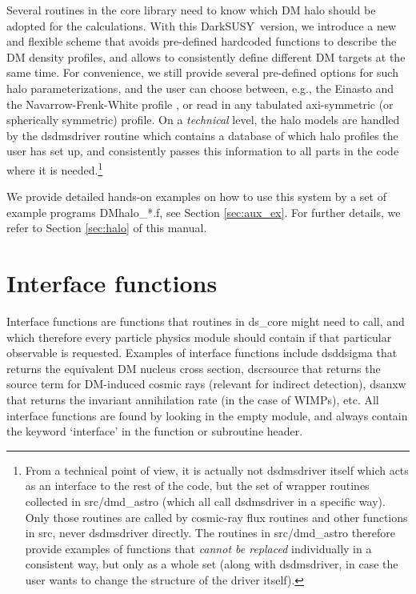 \documentclass[a4paper,10pt,oneside]{book}
\newcommand{\code}[1]{\ft{#1}}
\newcommand{\ds}{{\sffamily DarkSUSY}}
\newcommand{\ft}[1]{\textsf{#1}}
\begin{document}
Several routines in the core library need to know which DM halo should be adopted for the 
calculations. With this \ds\ version, we introduce a new and flexible scheme that avoids 
pre-defined hardcoded functions to describe the DM density profiles, and allows to 
consistently define different DM targets at the same time. For convenience, we still provide
several pre-defined options for such halo parameterizations, and the user can choose 
between, e.g., the Einasto \cite{1965TrAlm...5...87E} and the Navarrow-Frenk-White profile 
\cite{Navarro:1995iw}, or read in any tabulated axi-symmetric (or spherically symmetric) profile. 
On a {\it technical} level, the halo models are handled by the \code{dsdmsdriver} routine which 
contains a database of which  halo profiles the user has set up, and consistently passes this
information to all parts in the code where it is needed.\footnote{
From a technical point of view, it is actually not  \code{dsdmsdriver} itself which acts as an interface
to the rest of the code, but the set of wrapper routines collected in \code{src/dmd\_astro} (which all call \code{dsdmsdriver}
in a specific way). Only those routines are called by 
cosmic-ray flux routines and other functions in \code{src}, never \code{dsdmsdriver} directly.
The routines in  \code{src/dmd\_astro} therefore provide examples of functions that {\it cannot be
replaced} individually in a consistent way, but only as a whole set (along with \code{dsdmsdriver},
in case the user wants to change the structure of the driver itself).  
} 

We provide detailed hands-on examples on how to use this system by a set of example
programs \code{DMhalo\_*.f}, see Section \ref{sec:aux_ex}. For further details, we refer
to Section \ref{sec:halo} of this manual.


\section{Interface functions}
\label{sec:interface}

 Interface functions are functions that routines in \code{ds\_core} might need to call, and
which therefore every particle physics module should contain if that particular observable is requested. 
Examples of interface functions include \code{dsddsigma} that returns the equivalent DM nucleus cross section, \code{dscrsource} that 
returns the source term for DM-induced cosmic rays (relevant for indirect detection),
\code{dsanxw} that returns the invariant annihilation rate (in the case of WIMPs), etc.
 All interface functions are found by looking in the empty module, and always contain the 
 keyword `interface' in the function or subroutine header.
\end{document}
